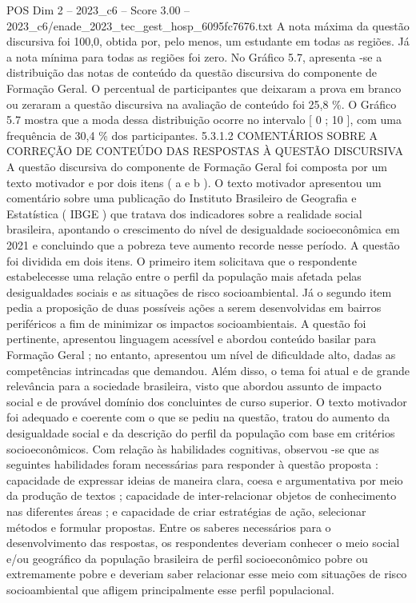 \begin{textsample}{POS Dim 2 – 2023\_c6 – Score 3.00 – 2023\_c6/enade\_2023\_tec\_gest\_hosp\_6095fc7676.txt}
A nota máxima da questão discursiva foi 100,0, obtida por, pelo menos, um estudante em todas as regiões.
Já a nota mínima para todas as regiões foi zero.
No Gráfico 5.7, apresenta -se a distribuição das notas de conteúdo da questão discursiva do componente de Formação Geral.
O percentual de participantes que deixaram a prova em branco ou zeraram a questão discursiva na avaliação de conteúdo foi 25,8 \%.
O Gráfico 5.7 mostra que a moda dessa distribuição ocorre no intervalo [ 0 ; 10 ], com uma frequência de 30,4 \% dos participantes. 5.3.1.2 COMENTÁRIOS SOBRE A CORREÇÃO DE CONTEÚDO DAS RESPOSTAS À QUESTÃO DISCURSIVA A questão discursiva do componente de Formação Geral foi composta por um texto motivador e por dois itens ( a e b ).
O texto motivador apresentou um comentário sobre uma publicação do Instituto Brasileiro de Geografia e Estatística ( IBGE ) que tratava dos indicadores sobre a realidade social brasileira, apontando o crescimento do nível de desigualdade socioeconômica em 2021 e concluindo que a pobreza teve aumento recorde nesse período.
A questão foi dividida em dois itens.
O primeiro item solicitava que o respondente estabelecesse uma relação entre o perfil da população mais afetada pelas desigualdades sociais e as situações de risco socioambiental.
Já o segundo item pedia a proposição de duas possíveis ações a serem desenvolvidas em bairros periféricos a fim de minimizar os impactos socioambientais.
A questão foi pertinente, apresentou linguagem acessível e abordou conteúdo basilar para Formação Geral ; no entanto, apresentou um nível de dificuldade alto, dadas as competências intrincadas que demandou.
Além disso, o tema foi atual e de grande relevância para a sociedade brasileira, visto que abordou assunto de impacto social e de provável domínio dos concluintes de curso superior.
O texto motivador foi adequado e coerente com o que se pediu na questão, tratou do aumento da desigualdade social e da descrição do perfil da população com base em critérios socioeconômicos.
Com relação às habilidades cognitivas, observou -se que as seguintes habilidades foram necessárias para responder à questão proposta : capacidade de expressar ideias de maneira clara, coesa e argumentativa por meio da produção de textos ; capacidade de inter-relacionar objetos de conhecimento nas diferentes áreas ; e capacidade de criar estratégias de ação, selecionar métodos e formular propostas.
Entre os saberes necessários para o desenvolvimento das respostas, os respondentes deveriam conhecer o meio social e/ou geográfico da população brasileira de perfil socioeconômico pobre ou extremamente pobre e deveriam saber relacionar esse meio com situações de risco socioambiental que afligem principalmente esse perfil populacional.

\end{textsample}
